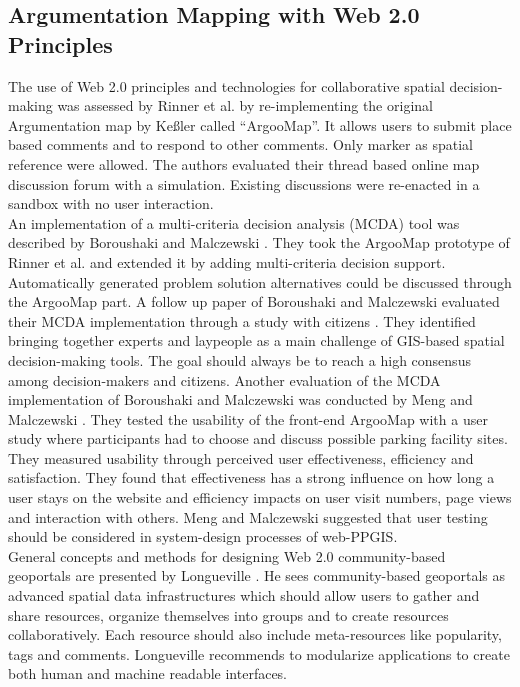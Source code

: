 \subsection{Argumentation Mapping with Web 2.0 Principles}
\label{zweifuenf}
The use of Web 2.0 principles and technologies for collaborative spatial decision-making was assessed by Rinner \cite{Rinner2009_Web2_argumap} et al. by re-implementing the original Argumentation map by Ke{\ss}ler \cite{Kessler2005_ArgumentationMapPrototype} called ``ArgooMap''. It allows users to submit place based comments and to respond to other comments. Only marker as spatial reference were allowed. The authors evaluated their thread based online map discussion forum with a simulation. Existing discussions were re-enacted in a sandbox with no user interaction.\\
An implementation of a multi-criteria decision analysis (MCDA) tool was described by Boroushaki and Malczewski \cite{Boroushaki2010_ParticipatoryGIS}. They took the ArgooMap prototype of Rinner et al. \cite{Rinner2009_Web2_argumap} and extended it by adding multi-criteria decision support. Automatically generated problem solution alternatives could be discussed through the ArgooMap part. A follow up paper of Boroushaki and Malczewski evaluated their MCDA implementation through a study with citizens \cite{Boroushaki2010_Consensus_measurement}. They identified bringing together experts and laypeople as a main challenge of GIS-based spatial decision-making tools. The goal should always be to reach a high consensus among decision-makers and citizens. Another evaluation of the MCDA implementation of Boroushaki and Malczewski was conducted by Meng and Malczewski \cite{Meng2010_ArgooMap_evaluation}. They tested the usability of the front-end ArgooMap with a user study where participants had to choose and discuss possible parking facility sites. They measured usability through perceived user effectiveness, efficiency and satisfaction. They found that effectiveness has a strong influence on how long a user stays on the website and efficiency impacts on user visit numbers, page views and interaction with others. Meng and Malczewski suggested that user testing should be considered in system-design processes of web-PPGIS.\\
General concepts and methods for designing Web 2.0 community-based geoportals are presented by Longueville \cite{Longueville2010_community_based_geoportals_web20}. He sees community-based geoportals as advanced spatial data infrastructures which should allow users to gather and share resources, organize themselves into groups and to create resources collaboratively. Each resource should also include meta-resources like popularity, tags and comments. Longueville recommends to modularize applications to create both human and machine readable interfaces.\\
